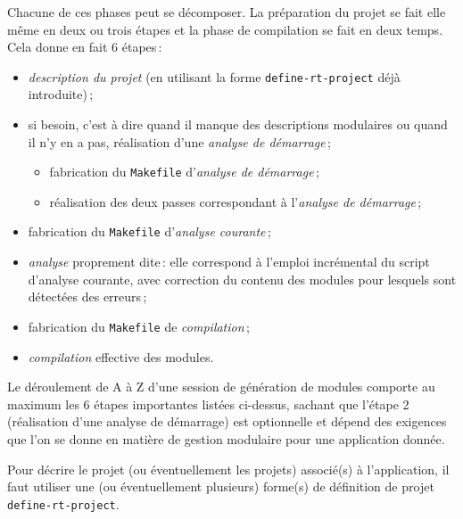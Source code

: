 Chacune de ces phases peut se d\'{e}composer. 
La pr\'{e}paration du projet se fait elle m\^{e}me en deux ou trois
\'{e}tapes et la phase de compilation se fait en deux temps.
Cela donne en fait 6 \'{e}tapes\,:
\begin{itemize}
\item {\em description du projet} (en utilisant la forme
{\tt define-rt-project} d\'{e}j\`{a} introduite)\,;

\item si besoin, c'est \`{a} dire quand il manque des descriptions
modulaires ou quand il n'y en a pas,
r\'{e}alisation d'une {\em analyse de d\'{e}marrage}\,;
\begin{itemize}
\item fabrication du {\tt Makefile} d'{\em analyse de d\'{e}marrage}\,;
\item r\'{e}alisation des deux passes correspondant \`{a}
l'{\em analyse de d\'{e}marrage}\,;
\end{itemize}

\item fabrication du {\tt Makefile} d'{\em analyse courante}\,;

\item {\em analyse} proprement dite\,: elle correspond
\`{a} l'emploi incr\'{e}mental du script d'analyse courante,
avec correction du contenu des modules pour lesquels
sont d\'{e}tect\'{e}es des erreurs\,;

\item fabrication du {\tt Makefile} de {\em compilation}\,;

\item {\em compilation} effective des modules. 
\end{itemize}

Le d\'{e}roulement de A \`{a} Z d'une session de g\'{e}n\'{e}ration de modules
comporte au maximum les 6 \'{e}tapes importantes list\'{e}es ci-dessus,
sachant que l'\'{e}tape 2 (r\'{e}alisation d'une analyse de d\'{e}marrage)
est optionnelle et d\'{e}pend des exigences que l'on se donne
en mati\`{e}re de gestion modulaire pour une application donn\'{e}e.




Pour d\'{e}crire le projet (ou \'{e}ventuellement les projets)
associ\'{e}(s) \`{a} l'application,
il faut utiliser une (ou \'{e}ventuellement plusieurs)
forme(s) de d\'{e}finition de projet {\tt define-rt-project}. 

